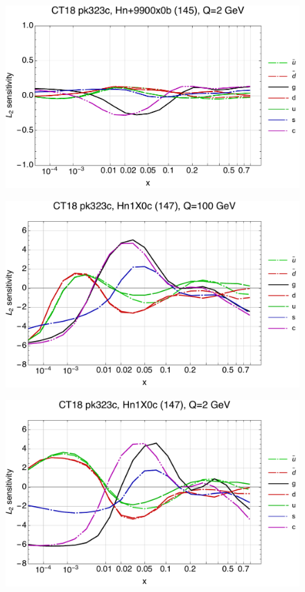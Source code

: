 \documentclass[10pt,aps,prd,floatfix,titlepage]{revtex4}
\begin{document}
\begin{figure}
\includegraphics[width=\textwidth,height=0.44\textheight,keepaspectratio]{1/145_ct18nn_L2_q2_Sf_1.pdf}
\caption{}
\end{figure}
\clearpage
\begin{figure}
\includegraphics[width=\textwidth,height=0.44\textheight,keepaspectratio]{1/147_ct18nn_L2_q100_Sf_1.pdf}
\caption{}
\end{figure}
\begin{figure}
\includegraphics[width=\textwidth,height=0.44\textheight,keepaspectratio]{1/147_ct18nn_L2_q2_Sf_1.pdf}
\caption{}
\end{figure}
\end{document}

